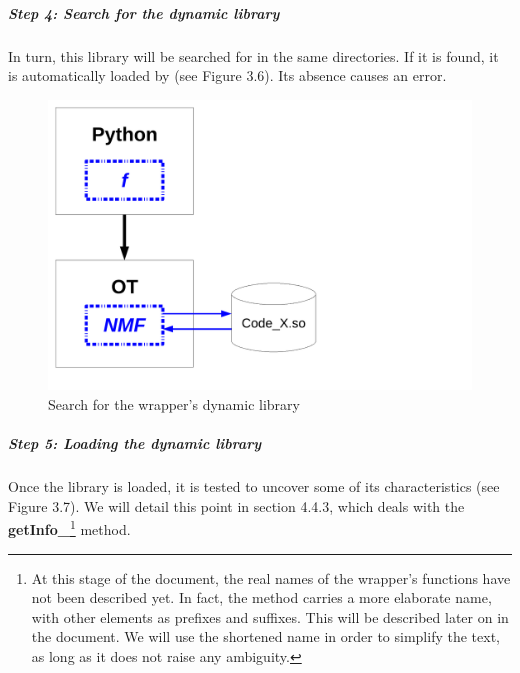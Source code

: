 \subparagraph{Step 4: Search for the dynamic library}

In turn, this library will be searched for in the same directories. If it is found, it is automatically loaded by \OT (see Figure 3.6). Its absence causes an error.

\begin{figure}
\begin{center}
\includegraphics[width=12cm]{Figures/wrapper/Figure6.pdf}
\caption[Figure 6]{Search for the wrapper's dynamic library}
\end{center}
\end{figure}

\subparagraph{Step 5: Loading the dynamic library}

Once the library is loaded, it is tested to uncover some of its characteristics (see Figure 3.7). We will detail this point in section 4.4.3, which deals with the {\bf getInfo\_}\footnote{At this stage of the document, the real names of the wrapper's functions have not been described yet. In fact, the  method carries a more elaborate name, with other elements as prefixes and suffixes. This will be described later on in the document. We will use the shortened name in order to simplify the text, as long as it does not raise any ambiguity.} method.


